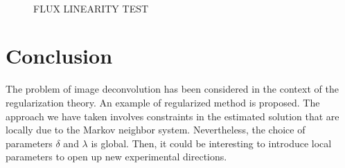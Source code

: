 \begin{figure}[htb]
\centerline{
\hbox{
}}
\caption{FLUX LINEARITY TEST}
\label{fig_flux}
\end{figure}

\section{Conclusion}

The problem of image deconvolution has been considered in the context of the
regularization theory. An example of regularized method is proposed. 
The approach we have taken involves constraints in the estimated solution 
that are locally due to the Markov 
neighbor system. Nevertheless, the choice of parameters $\delta$ and $\lambda$
is global. Then, it could be interesting to introduce 
local parameters to open up new experimental directions.




